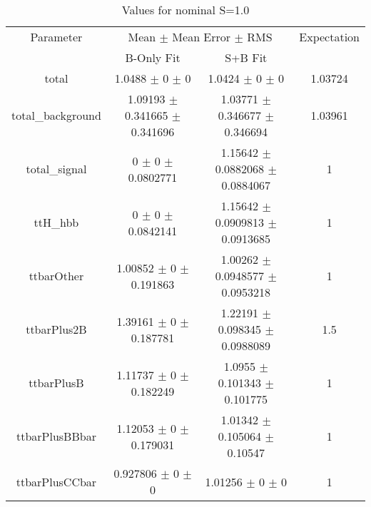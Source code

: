 \begin{table}
\centering
\caption{Values for nominal S=1.0}
\begin{tabular}{cccc}
\toprule
Parameter & \multicolumn{2}{c}{Mean $\pm$ Mean Error $\pm$ RMS} & Expectation\\
 & B-Only Fit & S+B Fit & \\
\midrule
total & \num{1.0488} $\pm$ \num{0} $\pm$ \num{0} & \num{1.0424} $\pm$ \num{0} $\pm$ \num{0} & \num{1.03724}\\
total\_background & \num{1.09193} $\pm$ \num{0.341665} $\pm$ \num{0.341696} & \num{1.03771} $\pm$ \num{0.346677} $\pm$ \num{0.346694} & \num{1.03961}\\
total\_signal & \num{0} $\pm$ \num{0} $\pm$ \num{0.0802771} & \num{1.15642} $\pm$ \num{0.0882068} $\pm$ \num{0.0884067} & \num{1}\\
ttH\_hbb & \num{0} $\pm$ \num{0} $\pm$ \num{0.0842141} & \num{1.15642} $\pm$ \num{0.0909813} $\pm$ \num{0.0913685} & \num{1}\\
ttbarOther & \num{1.00852} $\pm$ \num{0} $\pm$ \num{0.191863} & \num{1.00262} $\pm$ \num{0.0948577} $\pm$ \num{0.0953218} & \num{1}\\
ttbarPlus2B & \num{1.39161} $\pm$ \num{0} $\pm$ \num{0.187781} & \num{1.22191} $\pm$ \num{0.098345} $\pm$ \num{0.0988089} & \num{1.5}\\
ttbarPlusB & \num{1.11737} $\pm$ \num{0} $\pm$ \num{0.182249} & \num{1.0955} $\pm$ \num{0.101343} $\pm$ \num{0.101775} & \num{1}\\
ttbarPlusBBbar & \num{1.12053} $\pm$ \num{0} $\pm$ \num{0.179031} & \num{1.01342} $\pm$ \num{0.105064} $\pm$ \num{0.10547} & \num{1}\\
ttbarPlusCCbar & \num{0.927806} $\pm$ \num{0} $\pm$ \num{0} & \num{1.01256} $\pm$ \num{0} $\pm$ \num{0} & \num{1}\\
\bottomrule
\end{tabular}
\end{table}